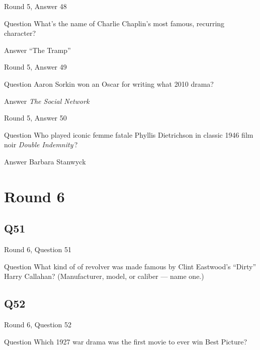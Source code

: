 \documentclass[11pt]{beamer}
\begin{document}
\begin{frame}[t]{Round 5, Answer 48}
\vspace{2em}
\begin{block}{Question}
What's the name of Charlie Chaplin's most famous, recurring character?
\end{block}
\pause{}
\begin{block}{Answer}
``The Tramp''
\end{block}
\end{frame}
    

\begin{frame}[t]{Round 5, Answer 49}
\vspace{2em}
\begin{block}{Question}
Aaron Sorkin won an Oscar for writing what 2010 drama?
\end{block}
\pause{}
\begin{block}{Answer}
\emph{The Social Network}
\end{block}
\end{frame}
    

\begin{frame}[t]{Round 5, Answer 50}
\vspace{2em}
\begin{block}{Question}
Who played iconic femme fatale Phyllis Dietrichson in classic 1946 film noir \emph{Double Indemnity}\,?
\end{block}
\pause{}
\begin{block}{Answer}
Barbara Stanwyck
\end{block}
\end{frame}
    

\section{Round 6}
    

\subsection*{Q51}
\begin{frame}[t]{Round 6, Question 51}
\vspace{2em}
\begin{block}{Question}
What kind of of revolver was made famous by Clint Eastwood's ``Dirty'' Harry Callahan? (Manufacturer, model, or caliber — name one.)
\end{block}
\end{frame}
    

\subsection*{Q52}
\begin{frame}[t]{Round 6, Question 52}
\vspace{2em}
\begin{block}{Question}
Which 1927 war drama was the first movie to ever win Best Picture?
\end{block}
\end{frame}
    
\end{document}
